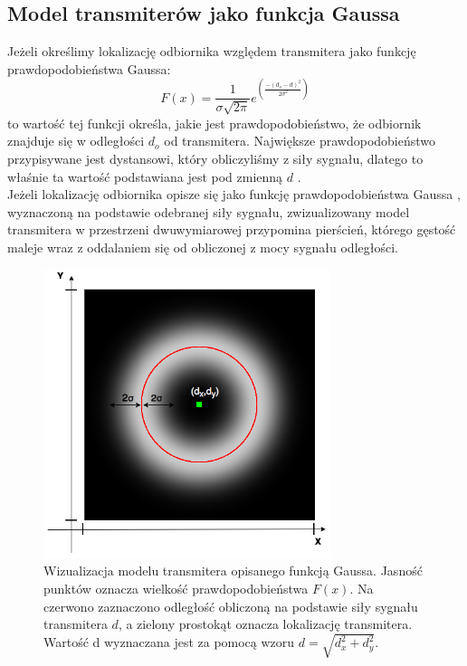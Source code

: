 \subsection{Model transmiterów jako funkcja Gaussa}
Jeżeli określimy lokalizację odbiornika względem transmitera jako funkcję prawdopodobieństwa Gaussa:
\begin{equation}
F(x) = \frac{1}{\sigma\sqrt{2\pi}}e^{\left(\frac{-(d_o-d)^2}{2\sigma^2}\right)}
\end{equation}
to wartość tej funkcji określa, jakie jest prawdopodobieństwo, że odbiornik znajduje się w odległości $d_o$ od transmitera. Największe prawdopodobieństwo przypisywane jest dystansowi, który obliczyliśmy z siły sygnału, dlatego to właśnie ta wartość podstawiana jest pod zmienną $d$ \cite{JK}.\\
Jeżeli lokalizację odbiornika opisze się jako funkcję prawdopodobieństwa Gaussa \cite{YX}, wyznaczoną na podstawie odebranej siły sygnału, zwizualizowany model transmitera w przestrzeni dwuwymiarowej przypomina pierścień, którego gęstość maleje wraz z oddalaniem się od obliczonej z mocy sygnału odległości.
\begin{figure}[H]			
	\centering
	\caption{Wizualizacja modelu transmitera opisanego funkcją Gaussa. Jasność punktów oznacza wielkość prawdopodobieństwa $F(x)$. Na czerwono zaznaczono odległość obliczoną na podstawie siły sygnału transmitera $d$, a zielony prostokąt oznacza lokalizację transmitera. Wartość d wyznaczana jest za pomocą wzoru $d = \sqrt{d_x^2 + d_y^2}$.}
	\includegraphics[width=0.75\textwidth]{router_Gaussa_wizualizacja}
\end{figure}
